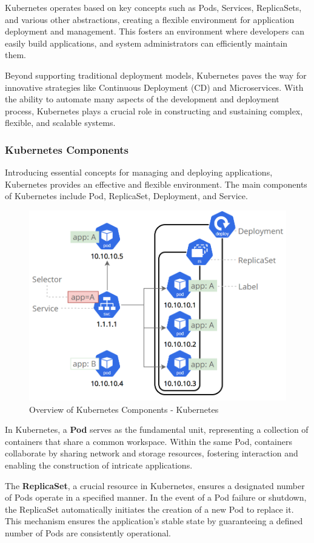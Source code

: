 Kubernetes operates based on key concepts such as Pods, Services, ReplicaSets,
and various other abstractions, creating a flexible environment for application
deployment and management. This fosters an environment where developers can
easily build applications, and system administrators can efficiently maintain
them.

Beyond supporting traditional deployment models, Kubernetes paves the way for
innovative strategies like Continuous Deployment (CD) and Microservices. With
the ability to automate many aspects of the development and deployment process,
Kubernetes plays a crucial role in constructing and sustaining complex,
flexible, and scalable systems.

\subsubsection*{Kubernetes Components}
Introducing essential concepts for managing and deploying applications,
Kubernetes provides an effective and flexible environment. The main components
of Kubernetes include Pod, ReplicaSet, Deployment, and Service.

\begin{figure}[H]
    \centering
    \includegraphics[width=0.75\linewidth]{Images/3.4-k8s-comps.png}
    \caption{Overview of Kubernetes Components - Kubernetes}
    \label{fig:k8s-comps}
\end{figure}

In Kubernetes, a \textbf{Pod} serves as the fundamental unit, representing a
collection of containers that share a common workspace. Within the same Pod,
containers collaborate by sharing network and storage resources, fostering
interaction and enabling the construction of intricate applications.

The \textbf{ReplicaSet}, a crucial resource in Kubernetes, ensures a designated
number of Pods operate in a specified manner. In the event of a Pod failure or
shutdown, the ReplicaSet automatically initiates the creation of a new Pod to
replace it. This mechanism ensures the application's stable state by
guaranteeing a defined number of Pods are consistently operational.

